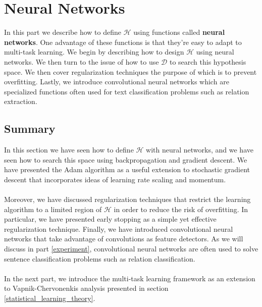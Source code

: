 \chapter{Neural Networks}
\label{neural_networks}

In this part we describe how to define $\mathcal{H}$ using functions called \textbf{neural networks}. One advantage of these functions is that they're easy to adapt to multi-task learning. We begin by describing how to design $\mathcal{H}$ using neural networks. We then turn to the issue of how to use $\mathcal{D}$ to search this hypothesis space. We then cover regularization techniques the purpose of which is to prevent overfitting. Lastly, we introduce convolutional neural networks which are specialized functions often used for text classification problems such as relation extraction.






\section{Summary}
In this section we have seen how to define $\mathcal{H}$ with neural networks, and we have seen how to search this space using backpropagation and gradient descent. We have presented the Adam algorithm as a useful extension to stochastic gradient descent that incorporates ideas of learning rate scaling and momentum.
\\\\
 Moreover, we have discussed regularization techniques that restrict the learning algorithm to a limited region of $\mathcal{H}$ in order to reduce the risk of overfitting. In particular, we have presented early stopping as a simple yet effective regularization technique. Finally, we have introduced convolutional neural networks that take advantage of convolutions as feature detectors. As we will discuss in part \ref{experiment}, convolutional neural networks are often used to solve sentence classification problems such as relation classification.
 \\\\
 In the next part, we introduce the multi-task learning framework as an extension to Vapnik-Chervonenkis analysis presented in section \ref{statistical_learning_theory}.